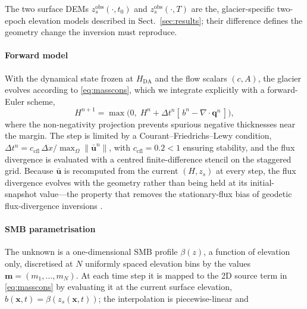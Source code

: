 The two surface DEMs $z_s^{\mathrm{obs}}(\cdot, t_0)$ and
$z_s^{\mathrm{obs}}(\cdot, T)$ are the, glacier-specific two-epoch
elevation models described in Sect.~\ref{sec:results}; their difference defines the
geometry change the inversion must reproduce.

\paragraph{Forward model}


With the dynamical state frozen at $H_{\mathrm{DA}}$ and the flow scalars
$(c, A)$, the glacier evolves according to \eqref{eq:masscons}, which we integrate
explicitly with a forward-Euler scheme,
\begin{equation}
  H^{n+1} = \max\!\big(0,\; H^n + \Delta t^n [\,b^n - \nabla\cdot\mathbf{q}^n\,]\big),
  \label{eq:euler}
\end{equation}
where the non-negativity projection prevents spurious negative thicknesses near the
margin. The step is limited by a Courant--Friedrichs--Lewy condition,
$\Delta t^n = c_{\mathrm{cfl}}\,\Delta x / \max_\Omega\|\bar{\mathbf{u}}^n\|$, with
$c_{\mathrm{cfl}} = 0.2<1$ ensuring stability, and the flux divergence is evaluated with a centred
finite-difference stencil on the staggered grid. Because $\bar{\mathbf{u}}$ is
recomputed from the current $(H, z_s)$ at every step, the flux divergence evolves
with the geometry rather than being held at its initial-snapshot value---the
property that removes the stationary-flux bias of geodetic flux-divergence
inversions \citep{miles2021, kneib2024}.

\paragraph{SMB parametrisation}
The unknown is a one-dimensional SMB profile $\beta(z)$, a function of elevation
only, discretised at $N$ uniformly spaced elevation bins by the values
$\mathbf{m} = (m_1, \ldots, m_N)$. At each time step it is mapped to the 2D source
term in \eqref{eq:masscons} by evaluating it at the current surface elevation,
$b(\mathbf{x}, t) = \beta(z_s(\mathbf{x}, t))$; the interpolation is
piecewise-linear and

